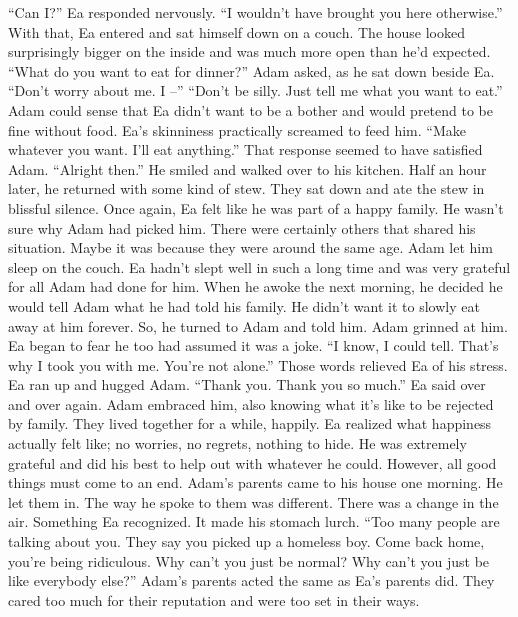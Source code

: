 \documentclass[openany, 12pt]{book}
\newcommand\tab[1][1cm]{\hspace*{#1}}
\begin{document}
\begin{itshape}
\newline
\tab
``Can I?'' Ea responded nervously.
\newline
\tab
``I wouldn’t have brought you here otherwise.'' With that, Ea entered and sat himself down on a couch. The house looked surprisingly bigger on the inside and was much more open than he’d expected. ``What do you want to eat for dinner?'' Adam asked, as he sat down beside Ea.
\newline
\tab
``Don’t worry about me. I --''
\newline
\tab
``Don’t be silly. Just tell me what you want to eat.'' Adam could sense that Ea didn’t want to be a bother and would pretend to be fine without food. Ea’s skinniness practically screamed to feed him.
\newline
\tab
``Make whatever you want. I’ll eat anything.'' That response seemed to have satisfied Adam.
\newline
\tab
``Alright then.'' He smiled and walked over to his kitchen. Half an hour later, he returned with some kind of stew. 
\newline
\tab
They sat down and ate the stew in blissful silence. Once again, Ea felt like he was part of a happy family. He wasn’t sure why Adam had picked him. There were certainly others that shared his situation. Maybe it was because they were around the same age. Adam let him sleep on the couch. Ea hadn’t slept well in such a long time and was very grateful for all Adam had done for him.
\newline
\tab
When he awoke the next morning, he decided he would tell Adam what he had told his family. He didn’t want it to slowly eat away at him forever. So, he turned to Adam and told him. Adam grinned at him. Ea began to fear he too had assumed it was a joke.  ``I know, I could tell. That’s why I took you with me. You’re not alone.'' Those words relieved Ea of his stress. Ea ran up and hugged Adam. 
\newline
\tab
``Thank you. Thank you so much.'' Ea said over and over again. Adam embraced him, also knowing what it’s like to be rejected by family.
\newline
\tab
They lived together for a while, happily. Ea realized what happiness actually felt like; no worries, no regrets, nothing to hide. He was extremely grateful and did his best to help out with whatever he could. However, all good things must come to an end.
\newline
\tab
Adam’s parents came to his house one morning. He let them in. The way he spoke to them was different. There was a change in the air. Something Ea recognized. It made his stomach lurch. ``Too many people are talking about you. They say you picked up a homeless boy. Come back home, you’re being ridiculous. Why can’t you just be normal? Why can’t you just be like everybody else?'' Adam’s parents acted the same as Ea’s parents did. They cared too much for their reputation and were too set in their ways.

\end{itshape}
\end{document}
